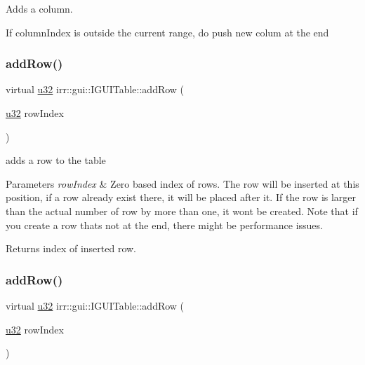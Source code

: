 Adds a column. 

If column\+Index is outside the current range, do push new colum at the end \mbox{\label{classirr_1_1gui_1_1IGUITable_a2cd5f569985f88c6fe55d99a86b79ca8}} 
\subsubsection{\texorpdfstring{add\+Row()}{addRow()}\hspace{0.1cm}{\footnotesize\ttfamily [1/2]}}
{\footnotesize\ttfamily virtual \hyperlink{namespaceirr_a0416a53257075833e7002efd0a18e804}{u32} irr\+::gui\+::\+I\+G\+U\+I\+Table\+::add\+Row (\begin{DoxyParamCaption}\item[{\hyperlink{namespaceirr_a0416a53257075833e7002efd0a18e804}{u32}}]{row\+Index }\end{DoxyParamCaption})\hspace{0.3cm}{\ttfamily [pure virtual]}}



adds a row to the table 


\begin{DoxyParams}{Parameters}
{\em row\+Index} & Zero based index of rows. The row will be inserted at this position, if a row already exist there, it will be placed after it. If the row is larger than the actual number of row by more than one, it won\textquotesingle{}t be created. Note that if you create a row that\textquotesingle{}s not at the end, there might be performance issues. \\
\hline
\end{DoxyParams}
\begin{DoxyReturn}{Returns}
index of inserted row. 
\end{DoxyReturn}
\mbox{\label{classirr_1_1gui_1_1IGUITable_a2cd5f569985f88c6fe55d99a86b79ca8}} 
\subsubsection{\texorpdfstring{add\+Row()}{addRow()}\hspace{0.1cm}{\footnotesize\ttfamily [2/2]}}
{\footnotesize\ttfamily virtual \hyperlink{namespaceirr_a0416a53257075833e7002efd0a18e804}{u32} irr\+::gui\+::\+I\+G\+U\+I\+Table\+::add\+Row (\begin{DoxyParamCaption}\item[{\hyperlink{namespaceirr_a0416a53257075833e7002efd0a18e804}{u32}}]{row\+Index }\end{DoxyParamCaption})\hspace{0.3cm}{\ttfamily [pure virtual]}}



